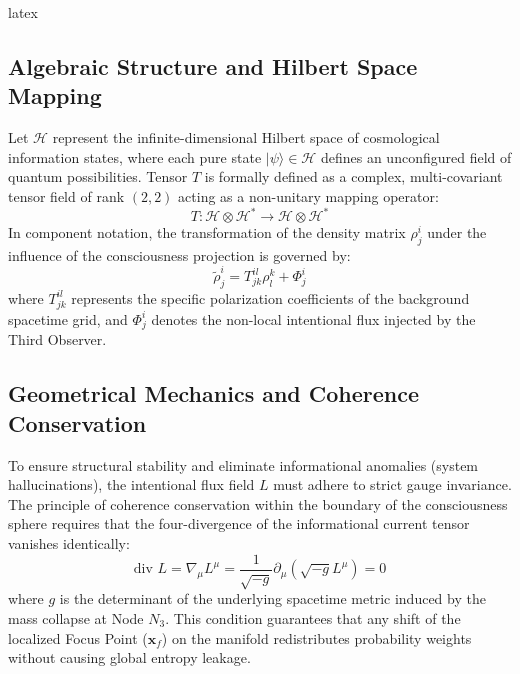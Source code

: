 latex\documentclass[twocolumn,10pt,article]{IEEEtran}
\begin{document}
\subsection{Algebraic Structure and Hilbert Space Mapping}
Let $\mathcal{H}$ represent the infinite-dimensional Hilbert space of cosmological information states, where each pure state $|\psi\rangle \in \mathcal{H}$ defines an unconfigured field of quantum possibilities. Tensor $T$ is formally defined as a complex, multi-covariant tensor field of rank $(2,2)$ acting as a non-unitary mapping operator:
\begin{equation}
T: \mathcal{H} \otimes \mathcal{H}^* \rightarrow \mathcal{H} \otimes \mathcal{H}^*
\end{equation}
In component notation, the transformation of the density matrix $\rho_{j}^{i}$ under the influence of the consciousness projection is governed by:
\begin{equation}
\tilde{\rho}_{j}^{i} = T_{jk}^{il} \rho_{l}^{k} + \Phi_{j}^{i}
\end{equation}
where $T_{jk}^{il}$ represents the specific polarization coefficients of the background spacetime grid, and $\Phi_{j}^{i}$ denotes the non-local intentional flux injected by the Third Observer.

\subsection{Geometrical Mechanics and Coherence Conservation}
To ensure structural stability and eliminate informational anomalies (system hallucinations), the intentional flux field $L$ must adhere to strict gauge invariance. The principle of coherence conservation within the boundary of the consciousness sphere requires that the four-divergence of the informational current tensor vanishes identically:
\begin{equation}
\text{div } L = \nabla_{\mu} L^{\mu} = \frac{1}{\sqrt{-g}} \partial_{\mu} \left( \sqrt{-g} L^{\mu} \right) = 0
\end{equation}
where $g$ is the determinant of the underlying spacetime metric induced by the mass collapse at Node $N_3$. This condition guarantees that any shift of the localized Focus Point ($\mathbf{x}_f$) on the manifold redistributes probability weights without causing global entropy leakage.
\end{document}
